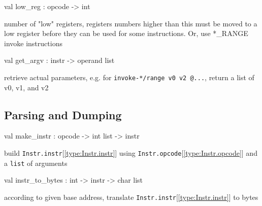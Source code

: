 \documentclass[11pt]{article}
\begin{document}
\label{val:Instr.low-underscorereg}\begin{ocamldoccode}
val low_reg : opcode -> int
\end{ocamldoccode}
\begin{ocamldocdescription}
number of "low" registers, registers numbers higher 
 than this must be moved to a low register before they 
 can be used for some instructions.
 Or, use *\_RANGE invoke instructions


\end{ocamldocdescription}




\label{val:Instr.get-underscoreargv}\begin{ocamldoccode}
val get_argv : instr -> operand list
\end{ocamldoccode}
\begin{ocamldocdescription}
retrieve actual parameters,
 e.g. for {\tt{invoke-*/range v0 v2 @...}}, return a list of v0, v1, and v2


\end{ocamldocdescription}




\subsection{Parsing and Dumping}




\label{val:Instr.make-underscoreinstr}\begin{ocamldoccode}
val make_instr : opcode -> int list -> instr
\end{ocamldoccode}
\begin{ocamldocdescription}
build {\tt{Instr.instr}}[\ref{type:Instr.instr}] using {\tt{Instr.opcode}}[\ref{type:Instr.opcode}] and a {\tt{list}} of arguments


\end{ocamldocdescription}




\label{val:Instr.instr-underscoreto-underscorebytes}\begin{ocamldoccode}
val instr_to_bytes : int -> instr -> char list
\end{ocamldoccode}
\begin{ocamldocdescription}
according to given base address, translate {\tt{Instr.instr}}[\ref{type:Instr.instr}] to bytes


\end{ocamldocdescription}
\end{document}
